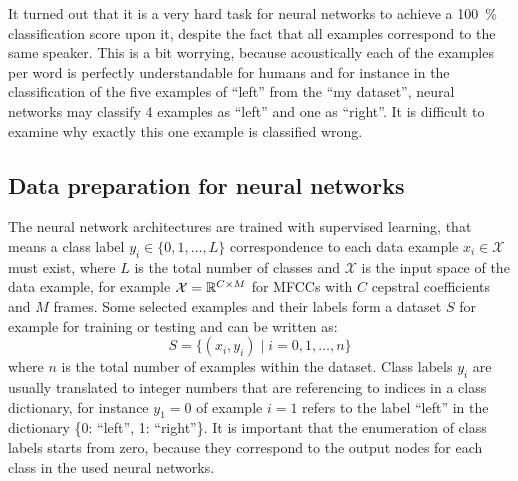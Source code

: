 \FloatBarrier
\noindent
It turned out that it is a very hard task for neural networks to achieve a \SI{100}{\percent} classification score upon it, despite the fact that all examples correspond to the same speaker.
This is a bit worrying, because acoustically each of the examples per word is perfectly understandable for humans and for instance in the classification of the five examples of \enquote{left} from the \enquote{my dataset}, neural networks may classify 4 examples as \enquote{left} and one as \enquote{right}.
It is difficult to examine why exactly this one example is classified wrong.



\subsection{Data preparation for neural networks}\label{sec:exp_data_prep}
The neural network architectures are trained with supervised learning, that means a class label $y_i \in \{0, 1, \dots, L\}$ correspondence to each data example $x_i \in \mathcal{X}$ must exist, where $L$ is the total number of classes and $\mathcal{X}$ is the input space of the data example, for example $\mathcal{X} = \mathbb{R}^{C \times M}$ for MFCCs with $C$ cepstral coefficients and $M$ frames.
Some selected examples and their labels form a dataset $S$ for example for training or testing and can be written as:
\begin{equation}\label{eq:exp_dataset}
  S = \{ (x_i, y_i) \mid i = 0, 1, \dots, n \}
\end{equation}
where $n$ is the total number of examples within the dataset.
Class labels $y_i$ are usually translated to integer numbers that are referencing to indices in a class dictionary, for instance $y_1 = 0$ of example $i=1$ refers to the label \enquote{left} in the dictionary \{0: \enquote{left}, 1: \enquote{right}\}.
It is important that the enumeration of class labels starts from zero, because they correspond to the output nodes for each class in the used neural networks.


